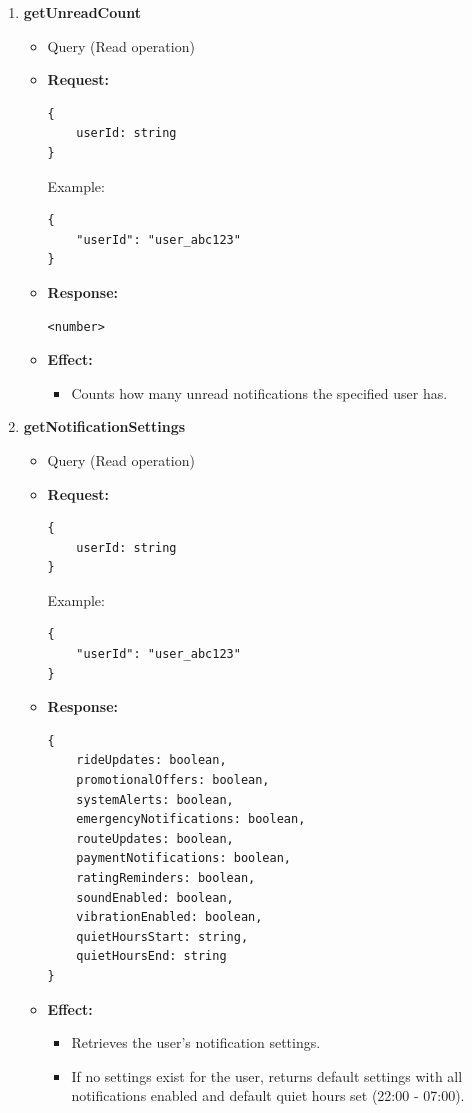 \documentclass[a4paper,12pt]{article}
\begin{document}
\begin{enumerate}
\item \textbf{getUnreadCount}
    \begin{itemize}
        \item Query (Read operation)
        \item \textbf{Request:}
        \begin{verbatim}
{
    userId: string
}
        \end{verbatim}
        Example:
        \begin{verbatim}
{
    "userId": "user_abc123"
}
        \end{verbatim}
        \item \textbf{Response:}
        \begin{verbatim}
<number>
        \end{verbatim}
        \item \textbf{Effect:}
        \begin{itemize}
            \item Counts how many unread notifications the specified user has.
        \end{itemize}
    \end{itemize}

    \item \textbf{getNotificationSettings}
    \begin{itemize}
        \item Query (Read operation)
        \item \textbf{Request:}
        \begin{verbatim}
{
    userId: string
}
        \end{verbatim}
        Example:
        \begin{verbatim}
{
    "userId": "user_abc123"
}
        \end{verbatim}
        \item \textbf{Response:}
        \begin{verbatim}
{
    rideUpdates: boolean,
    promotionalOffers: boolean,
    systemAlerts: boolean,
    emergencyNotifications: boolean,
    routeUpdates: boolean,
    paymentNotifications: boolean,
    ratingReminders: boolean,
    soundEnabled: boolean,
    vibrationEnabled: boolean,
    quietHoursStart: string,
    quietHoursEnd: string
}
        \end{verbatim}
        \item \textbf{Effect:}
        \begin{itemize}
            \item Retrieves the user's notification settings.
            \item If no settings exist for the user, returns default settings with all notifications enabled and default quiet hours set (22:00 - 07:00).
        \end{itemize}
    \end{itemize}


\end{enumerate}
\end{document}
